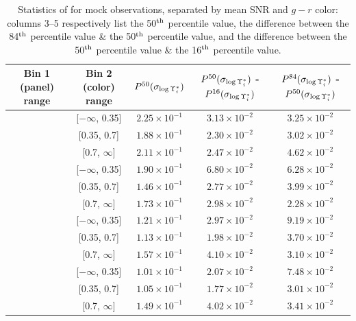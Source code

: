 \begin{table}[p]
    \centering
    \begin{tabular}{||c|c|c|c|c||} \hline \hline
        Bin 1 (panel) range & Bin 2 (color) range & $P^{50}(\sigma_{\log \Upsilon^*_{i}})$ & $P^{50}(\sigma_{\log \Upsilon^*_{i}})$  - $P^{16}(\sigma_{\log \Upsilon^*_{i}})$ & $P^{84}(\sigma_{\log \Upsilon^*_{i}})$ - $P^{50}(\sigma_{\log \Upsilon^*_{i}})$ \\ \hline \hline
        [$-\infty$, 2.0] & [$-\infty$, 0.35] & $2.25 \times 10^{-1}$ & $3.13 \times 10^{-2}$ & $3.25 \times 10^{-2}$ \\ \hline
        [$-\infty$, 2.0] & [0.35, 0.7] & $1.88 \times 10^{-1}$ & $2.30 \times 10^{-2}$ & $3.02 \times 10^{-2}$ \\ \hline
        [$-\infty$, 2.0] & [0.7, $\infty$] & $2.11 \times 10^{-1}$ & $2.47 \times 10^{-2}$ & $4.62 \times 10^{-2}$ \\ \hline
        [2.0, 10.0] & [$-\infty$, 0.35] & $1.90 \times 10^{-1}$ & $6.80 \times 10^{-2}$ & $6.28 \times 10^{-2}$ \\ \hline
        [2.0, 10.0] & [0.35, 0.7] & $1.46 \times 10^{-1}$ & $2.77 \times 10^{-2}$ & $3.99 \times 10^{-2}$ \\ \hline
        [2.0, 10.0] & [0.7, $\infty$] & $1.73 \times 10^{-1}$ & $2.98 \times 10^{-2}$ & $2.28 \times 10^{-2}$ \\ \hline
        [10.0, 20.0] & [$-\infty$, 0.35] & $1.21 \times 10^{-1}$ & $2.97 \times 10^{-2}$ & $9.19 \times 10^{-2}$ \\ \hline
        [10.0, 20.0] & [0.35, 0.7] & $1.13 \times 10^{-1}$ & $1.98 \times 10^{-2}$ & $3.70 \times 10^{-2}$ \\ \hline
        [10.0, 20.0] & [0.7, $\infty$] & $1.57 \times 10^{-1}$ & $4.10 \times 10^{-2}$ & $3.10 \times 10^{-2}$ \\ \hline
        [20.0, $\infty$] & [$-\infty$, 0.35] & $1.01 \times 10^{-1}$ & $2.07 \times 10^{-2}$ & $7.48 \times 10^{-2}$ \\ \hline
        [20.0, $\infty$] & [0.35, 0.7] & $1.05 \times 10^{-1}$ & $1.77 \times 10^{-2}$ & $3.01 \times 10^{-2}$ \\ \hline
        [20.0, $\infty$] & [0.7, $\infty$] & $1.49 \times 10^{-1}$ & $4.02 \times 10^{-2}$ & $3.41 \times 10^{-2}$ \\ \hline
    \end{tabular}
    \caption[Statistics of  for mock observations, separated by mean SNR and $g - r$ color]{\fixspacing Statistics of  for mock observations, separated by mean SNR and $g - r$ color: columns 3--5 respectively list the 50$^{\rm th}$ percentile value, the difference between the 84$^{\rm th}$ percentile value \& the 50$^{\rm th}$ percentile value, and the difference between the 50$^{\rm th}$ percentile value \& the 16$^{\rm th}$ percentile value.}
    \label{tab:mocks_snr_color_widMLi}
\end{table}

